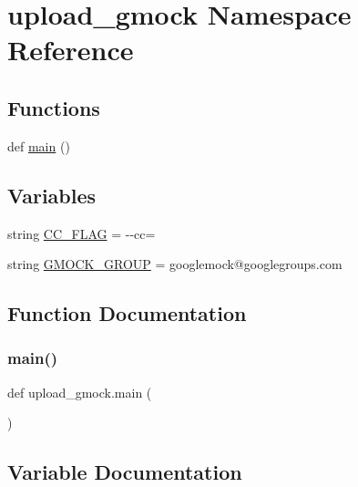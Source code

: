 \hypertarget{namespaceupload__gmock}{}\section{upload\+\_\+gmock Namespace Reference}
\label{namespaceupload__gmock}
\subsection*{Functions}
\begin{DoxyCompactItemize}
\item 
def \hyperlink{namespaceupload__gmock_aea9cb062f9294622c32e54eb937f588e}{main} ()
\end{DoxyCompactItemize}
\subsection*{Variables}
\begin{DoxyCompactItemize}
\item 
string \hyperlink{namespaceupload__gmock_a463de67b37725c16ba31c5d4702e15b8}{C\+C\+\_\+\+F\+L\+AG} = \textquotesingle{}-\/-\/cc=\textquotesingle{}
\item 
string \hyperlink{namespaceupload__gmock_acf8fe60647d8c3748b0e22dcf669efee}{G\+M\+O\+C\+K\+\_\+\+G\+R\+O\+UP} = \textquotesingle{}googlemock@googlegroups.\+com\textquotesingle{}
\end{DoxyCompactItemize}


\subsection{Function Documentation}
\mbox{\label{namespaceupload__gmock_aea9cb062f9294622c32e54eb937f588e}} 
\subsubsection{\texorpdfstring{main()}{main()}}
{\footnotesize\ttfamily def upload\+\_\+gmock.\+main (\begin{DoxyParamCaption}{ }\end{DoxyParamCaption})}



\subsection{Variable Documentation}
\mbox{\label{namespaceupload__gmock_a463de67b37725c16ba31c5d4702e15b8}} 
